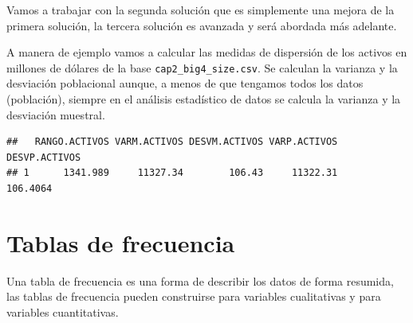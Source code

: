 \documentclass[]{book}
\newenvironment{Shaded}{\begin{snugshade}}{\end{snugshade}}
\newcommand{\DataTypeTok}[1]{\textcolor[rgb]{0.13,0.29,0.53}{#1}}
\newcommand{\DecValTok}[1]{\textcolor[rgb]{0.00,0.00,0.81}{#1}}
\newcommand{\KeywordTok}[1]{\textcolor[rgb]{0.13,0.29,0.53}{\textbf{#1}}}
\newcommand{\NormalTok}[1]{#1}
\newcommand{\OperatorTok}[1]{\textcolor[rgb]{0.81,0.36,0.00}{\textbf{#1}}}
\newcommand{\StringTok}[1]{\textcolor[rgb]{0.31,0.60,0.02}{#1}}
\begin{document}
Vamos a trabajar con la segunda solución que es simplemente una mejora de la primera solución, la tercera solución es avanzada y será abordada más adelante.

A manera de ejemplo vamos a calcular las medidas de dispersión de los activos en millones de dólares de la base \texttt{cap2\_big4\_size.csv}. Se calculan la varianza y la desviación poblacional aunque, a menos de que tengamos todos los datos (población), siempre en el análisis estadístico de datos se calcula la varianza y la desviación muestral.

\begin{Shaded}
\end{Shaded}

\begin{verbatim}
##   RANGO.ACTIVOS VARM.ACTIVOS DESVM.ACTIVOS VARP.ACTIVOS DESVP.ACTIVOS
## 1      1341.989     11327.34        106.43     11322.31      106.4064
\end{verbatim}

\hypertarget{tablas-de-frecuencia}{%
\section{Tablas de frecuencia}\label{tablas-de-frecuencia}}

Una tabla de frecuencia es una forma de describir los datos de forma resumida, las tablas de frecuencia pueden construirse para variables cualitativas y para variables cuantitativas.
\end{document}
